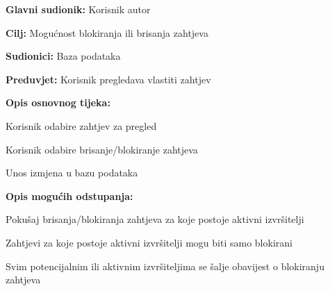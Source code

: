 					\noindent {}
					\begin{packed_item}
						
						\item \textbf{Glavni sudionik: }Korisnik autor
						\item  \textbf{Cilj:} Mogućnost blokiranja ili brisanja zahtjeva
						\item  \textbf{Sudionici:} Baza podataka
						\item  \textbf{Preduvjet:} Korisnik pregledava vlastiti zahtjev
						\item  \textbf{Opis osnovnog tijeka:}
						
						\item[] \begin{packed_enum}
							
							\item Korisnik odabire zahtjev za pregled
							\item Korisnik odabire brisanje/blokiranje zahtjeva
							\item Unos izmjena u bazu podataka
							
						\end{packed_enum}
					
						\item  \textbf{Opis mogućih odstupanja:}
						
						\item[] \begin{packed_item}
							
							\item[2.a] Pokušaj brisanja/blokiranja zahtjeva za koje postoje aktivni izvršitelji
							\item[] \begin{packed_enum}
								
								\item Zahtjevi za koje postoje aktivni izvršitelji mogu biti samo blokirani 
								\item Svim potencijalnim ili aktivnim izvršiteljima se šalje obavijest o blokiranju zahtjeva
								
							\end{packed_enum}				
						\end{packed_item}
						
					\end{packed_item}
				
